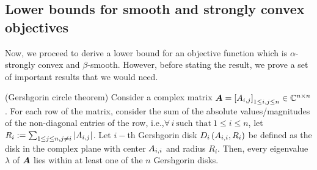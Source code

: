 \documentclass{article}
\begin{document}
\subsection{Lower bounds for smooth and strongly convex objectives}
Now, we proceed to derive a lower bound for an objective function which is $\alpha$-strongly convex and $\beta$-smooth. 
However, before stating the result, we prove a set of important results that we would need.
\begin{thm}
(Gershgorin circle theorem) 
\label{thm:gersh}
Consider a complex matrix ${\bm{A}} = \left[{A}_{i, j}\right]_{1\leq i, j\leq n}\in\mathbb{C}^{n\times n}$. 
For each row of the matrix, consider the sum of the absolute values/magnitudes of the non-diagonal entries of the row, i.e.,$\forall\,i\ \text{such that}\ 1\leq i\leq n$, let $R_i:=\sum\nolimits_{1\leq j\leq n, j\ne i} \left\lvert {A}_{i, j} \right\rvert$.
Let $i-$th Gershgorin disk $D_{i}\left({A}_{i, i}, R_i\right)$ be defined as the disk in the complex plane with center ${A}_{i, i}$ and radius $R_i$.
Then, every eigenvalue $\lambda$ of ${\bm{A}}$ lies within at least one of the $n$ Gershgorin disks.
\end{thm}
\end{document}
